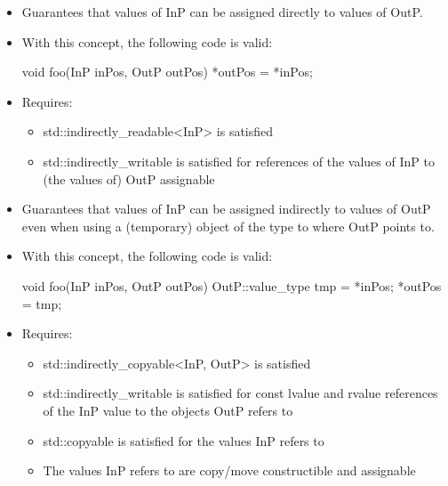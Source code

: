 
\begin{itemize}
\item
Guarantees that values of InP can be assigned directly to values of OutP.

\item
With this concept, the following code is valid:

\begin{cpp}
void foo(InP inPos, OutP outPos) {
	*outPos = *inPos;
}
\end{cpp}

\item
Requires:
\begin{itemize}
\item
std::indirectly\_readable<InP> is satisfied

\item
std::indirectly\_writable is satisfied for references of the values of InP to (the values of) OutP assignable
\end{itemize}
\end{itemize}


\begin{itemize}
\item
Guarantees that values of InP can be assigned indirectly to values of OutP even when using a (temporary) object of the type to where OutP points to.

\item
With this concept, the following code is valid:

\begin{cpp}
void foo(InP inPos, OutP outPos) {
	OutP::value_type tmp = *inPos;
	*outPos = tmp;
}
\end{cpp}

\item
Requires:
\begin{itemize}
\item
std::indirectly\_copyable<InP, OutP> is satisfied

\item
std::indirectly\_writable is satisfied for const lvalue and rvalue references of the InP value to the objects OutP refers to

\item
std::copyable is satisfied for the values InP refers to

\item
The values InP refers to are copy/move constructible and assignable
\end{itemize}
\end{itemize}


